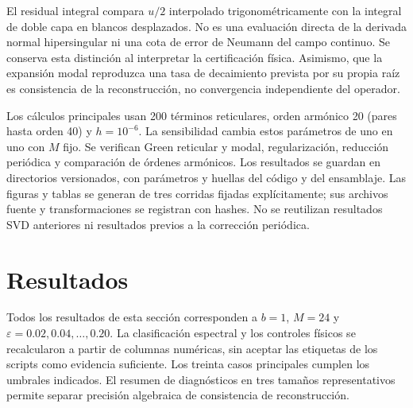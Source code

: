 \documentclass[11pt]{article}
\newcommand{\eps}{\varepsilon}
\begin{document}
El residual integral compara $u/2$ interpolado trigonométricamente con la integral de doble capa en blancos desplazados. No es una evaluación directa de la derivada normal hipersingular ni una cota de error de Neumann del campo continuo. Se conserva esta distinción al interpretar la certificación física. Asimismo, que la expansión modal reproduzca una tasa de decaimiento prevista por su propia raíz es consistencia de la reconstrucción, no convergencia independiente del operador.

Los cálculos principales usan 200 términos reticulares, orden armónico 20 (pares hasta orden 40) y $h=10^{-6}$. La sensibilidad cambia estos parámetros de uno en uno con $M$ fijo. Se verifican Green reticular y modal, regularización, reducción periódica y comparación de órdenes armónicos. Los resultados se guardan en directorios versionados, con parámetros y huellas del código y del ensamblaje. Las figuras y tablas se generan de tres corridas fijadas explícitamente; sus archivos fuente y transformaciones se registran con hashes. No se reutilizan resultados SVD anteriores ni resultados previos a la corrección periódica.
\begin{table}[!htbp]\centering
\caption{Parámetros de evaluación principales. $H$ es el índice máximo de pares armónicos y $N_{\mathrm{lat}}$ la truncación de las sumas aceleradas; $M$ es el número de nodos de frontera. Se fija $b=1$.}
\label{tab:configuration}
\end{table}


\section{Resultados}
Todos los resultados de esta sección corresponden a $b=1$, $M=24$ y $\eps=0.02,0.04,\ldots,0.20$. La clasificación espectral y los controles físicos se recalcularon a partir de columnas numéricas, sin aceptar las etiquetas de los scripts como evidencia suficiente. Los treinta casos principales cumplen los umbrales indicados. El resumen de diagnósticos en tres tamaños representativos permite separar precisión algebraica de consistencia de reconstrucción.
\begin{table}[!htbp]\centering
\caption{Diagnósticos en tres tamaños representativos de cada configuración. El canal $n=1$ está cerrado en 2.1. Las tolerancias de cada columna son distintas; el residual BIE mide consistencia integral fuera de los nodos.}
\label{tab:diagnostics}
\end{table}
\end{document}
